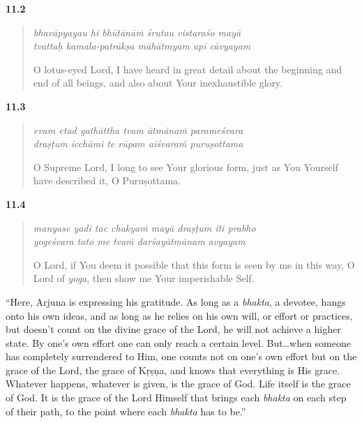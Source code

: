 \par\noindent\textbf{11.2}\par
\begin{verse}
\textit{bhavāpyayau hi bhūtānāṁ śrutau vistaraśo mayā} \\
\textit{tvattaḥ kamala-patrākṣa māhātmyam api cāvyayam}

\noindent O lotus-eyed Lord, I have heard in great detail about the beginning and end of all beings, and also about Your inexhaustible glory.
\end{verse}
\par



\par\noindent\textbf{11.3}\par
\begin{verse}
\textit{evam etad yathāttha tvam ātmānaṁ parameśvara} \\
\textit{draṣṭum icchāmi te rūpam aiśvaraṁ puruṣottama}

\noindent O Supreme Lord, I long to see Your glorious form, just as You Yourself have described it, O Puruṣottama.
\end{verse}
\par



\par\noindent\textbf{11.4}\par
\begin{verse}
\textit{manyase yadi tac chakyaṁ mayā draṣṭum iti prabho} \\
\textit{yogeśvara tato me tvaṁ darśayātmānam avyayam}

\noindent O Lord, if You deem it possible that this form is seen by me in this way, O Lord of \textit{yoga}, then show me Your imperishable Self.
\end{verse}
\par


\enquote{Here, Arjuna is expressing his gratitude. As long as a \textit{bhakta}, a devotee, hangs onto his own ideas, and as long as he relies on his own will, or effort or practices, but doesn’t count on the divine grace of the Lord, he will not achieve a higher state. By one’s own effort one can only reach a certain level. But\ldots when someone has completely surrendered to Him, one counts not on one’s own effort but on the grace of the Lord, the grace of Kṛṣṇa, and knows that everything is His grace. Whatever happens, whatever is given, is the grace of God. Life itself is the grace of God. It is the grace of the Lord Himself that brings each \textit{bhakta} on each step of their path, to the point where each \textit{bhakta} has to be.}

